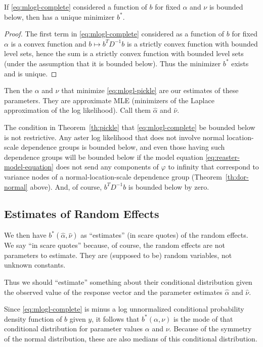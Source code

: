 \begin{theorem} \label{th:pickle}
If \eqref{eq:mlogl-complete} considered a function of $b$ for
fixed $\alpha$ and $\nu$ is bounded below, then has a unique minimizer $b^*$.
\end{theorem}
\begin{proof}
The first term in \eqref{eq:mlogl-complete} considered as a function of $b$
for fixed $\alpha$ is a convex function and $b \mapsto b^T D^{-1} b$ is a
strictly convex function with bounded level sets,
hence the sum is a strictly convex function with bounded level sets
(under the assumption that it is bounded below).
Thus the minimizer $b^*$ exists and is unique.
\end{proof}

Then the $\alpha$ and $\nu$ that minimize \eqref{eq:mlogl-pickle} are
our estimates of these parameters.  They are approximate MLE (minimizers
of the Laplace approximation of the log likelihood).  Call them $\hat{\alpha}$
and $\hat{\nu}$.

The condition in Theorem~\ref{th:pickle} that \eqref{eq:mlogl-complete} be
bounded below is not restrictive.
Any aster log likelihood that does not involve
normal location-scale dependence groups is bounded below, and even those
having such dependence groups will be bounded below if the model equation
\eqref{eq:reaster-model-equation} does not send any components of $\varphi$
to infinity that correspond to variance nodes of a normal-location-scale
dependence group (Theorem~\ref{th:dor-normal} above).  And, of course,
$b^T D^{-1} b$ is bounded below by zero.

\subsection{Estimates of Random Effects}

We then have $b^*(\hat{\alpha}, \hat{\nu})$ as ``estimates'' (in scare quotes)
of the random effects.  We say ``in scare quotes'' because, of course, the
random effects are not parameters to estimate.  They are (supposed to be)
random variables, not unknown constants.

Thus we should ``estimate'' something about their conditional distribution
given the observed value of the response vector and the parameter estimates
$\hat{\alpha}$ and $\hat{\nu}$.

Since \eqref{eq:mlogl-complete} is minus a log unnormalized
conditional probability density function of $b$ given $y$, it follows
that $b^*(\alpha, \nu)$ is the mode of that conditional distribution
for parameter values $\alpha$ and $\nu$.
Because of the symmetry of the normal distribution, these are also medians
of this conditional distribution.


